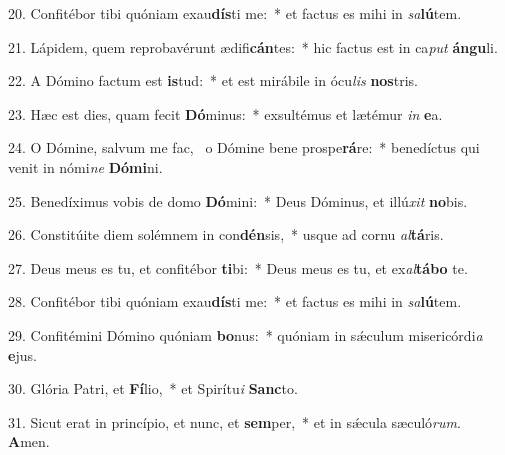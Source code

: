 20. Confitébor tibi quóniam exau\textbf{dís}ti me:~*  et factus es mihi in \textit{sa}\textbf{lú}tem.\

21. Lápidem, quem reprobavérunt ædifi\textbf{cán}tes:~*  hic factus est in ca\textit{put} \textbf{án}\textbf{gu}li.\

22. A Dómino factum est \textbf{is}tud:~*  et est mirábile in ócu\textit{lis} \textbf{nos}tris.\

23. Hæc est dies, quam fecit \textbf{Dó}minus:~*  exsultémus et lætémur \textit{in} \textbf{e}a.\

24. O Dómine, salvum me fac, \dag\  o Dómine bene prospe\textbf{rá}re:~*  benedíctus qui venit in nómi\textit{ne} \textbf{Dó}\textbf{mi}ni.\

25. Benedíximus vobis de domo \textbf{Dó}mini:~*  Deus Dóminus, et illú\textit{xit} \textbf{no}bis.\

26. Constitúite diem solémnem in con\textbf{dén}sis,~*  usque ad cornu \textit{al}\textbf{tá}ris.\

27. Deus meus es tu, et confitébor \textbf{ti}bi:~*  Deus meus es tu, et ex\textit{al}\textbf{tá}\textbf{bo} te.\

28. Confitébor tibi quóniam exau\textbf{dís}ti me:~*  et factus es mihi in \textit{sa}\textbf{lú}tem.\

29. Confitémini Dómino quóniam \textbf{bo}nus:~*  quóniam in sǽculum misericórdi\textit{a} \textbf{e}jus.\

30. Glória Patri, et \textbf{Fí}lio,~*  et Spirítu\textit{i} \textbf{Sanc}to.\

31. Sicut erat in princípio, et nunc, et \textbf{sem}per,~*  et in sǽcula sæculó\textit{rum}. \textbf{A}men.\

